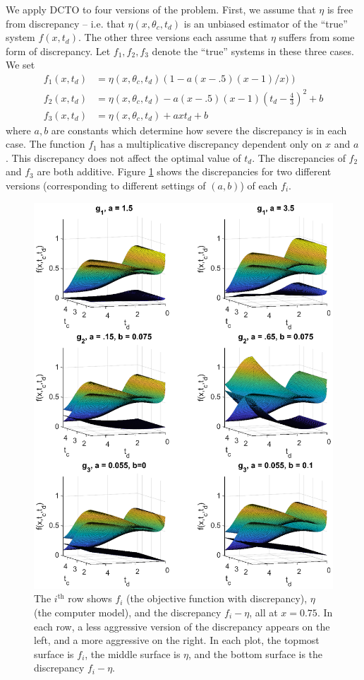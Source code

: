 \documentclass[12pt]{article}
\begin{document}
% 
We apply DCTO to four versions of the problem.
%
First, we assume that $\eta$ is free from discrepancy -- i.e. that $\eta(x,\theta_c,t_d)$ is an unbiased estimator of the ``true'' system $f(x,t_d)$.
%
The other three versions each assume that $\eta$ suffers from some form of discrepancy.
%
Let $f_1,f_2,f_3$ denote the ``true'' systems in these three cases.
%
We set 
\begin{align*}
	f_1(x,t_d) &= \eta(x,\theta_c,t_d) \left(1-a(x-.5)(x-1)/x) \right) \\
	f_2(x,t_d)&= \eta(x,\theta_c,t_d) - a(x-.5)(x-1)\left(t_d-\frac43\right)^2 + b\\
	f_3(x,t_d)&=\eta(x,\theta_c,t_d) + axt_d+b
\end{align*}
%
where $a,b$ are constants which determine how severe the discrepancy is in each case. 
%
The function $f_1$ has a multiplicative discrepancy dependent only on $x$ and $a$. 
%
This discrepancy does not affect the optimal value of $t_d$.  
%
The discrepancies of $f_2$ and $f_3$ are both additive.
%
Figure \ref{fig:discrepancies} shows the discrepancies for two different versions (corresponding to different settings of $(a,b)$) of each $f_i$.
%
\begin{figure}
	\centering
	\includegraphics[scale=0.85]{FIG_six_discrepancies.eps}
	\captionsetup{width=.85\linewidth}
	\caption{The $i^{\text{th}}$ row shows $f_i$ (the objective function with discrepancy), $\eta$ (the computer model), and the discrepancy $f_i-\eta$, all at $x=0.75$. In each row, a less aggressive version of the discrepancy appears on the left, and a more aggressive on the right. In each plot, the topmost surface is $f_i$, the middle surface is $\eta$, and the bottom surface is the discrepancy $f_i-\eta$.}
	\label{fig:discrepancies}
\end{figure}
\end{document}
